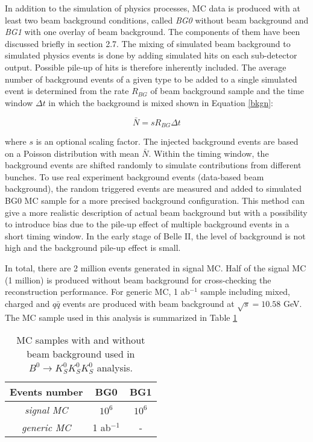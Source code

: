 In addition to the simulation of physics processes,  MC data is produced with at least two beam background conditions, called \textit{BG0} without beam background and \textit{BG1} with one overlay of beam background. The components of them have been discussed briefly in section 2.7. The mixing of simulated beam background to simulated physics events is done by adding simulated hits on each sub-detector output. Possible pile-up of hits is therefore inherently included. The average number of background events of a given type to be added to a single simulated event is determined from the rate $R_{BG}$ of beam background sample and the time window $\Delta t$ in which the background is mixed shown in Equation \ref{bkgn}:

\begin{equation}\label{bkgn}
	\bar{N} = sR_{BG}\Delta t
\end{equation}

where $s$ is an optional scaling factor. The injected background events are based on a Poisson distribution with mean $\bar{N}$. Within the timing window, the background events are shifted randomly to simulate contributions from different bunches. To use real experiment background events (data-based beam background), the random triggered events are measured and added to
simulated BG0 MC sample for a more precised background configuration. This method can give a more realistic description of actual beam background but with a possibility to introduce bias due to the pile-up effect of multiple background events in a short timing window. In the early stage of Belle II, the level of background is not high and the background pile-up effect is small.

In total, there are 2 million events generated in signal MC. Half of the signal MC (1 million) is produced without beam background for cross-checking the reconstruction performance. For generic MC, 1 ab$^{-1}$ sample including mixed, charged and $q\bar{q}$ events are produced with beam background at  $\sqrt{s} = 10.58 $ GeV. The MC sample used in this analysis is summarized in Table \ref{tab:mc_all}

\begin{table}
	\large
	\caption{MC samples with and without beam background used in $B^0 \to K_S^0  K_S^0  K_S^0$ analysis.}
	\label{tab:mc_all}
	\centering
	\begin{tabular}{c|c|c}
		\hline 
		Events number & BG0 & BG1 \\
		\hline
		\textit{signal MC} & $10^6$ & $10^6$ \\
		\hline
		\textit{generic MC} & 1 ab$^{-1}$ & -\\
		\hline
	\end{tabular}
\end{table}



